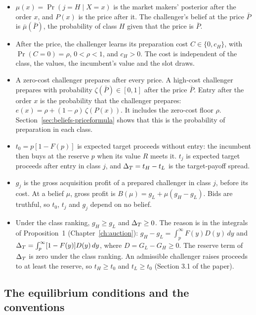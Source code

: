 \begin{itemize}
\item \(\mu(x)=\Pr(j=H\mid X=x)\) is the market makers' posterior after the order \(x\), and \(P(x)\) is the price after it. The challenger's belief at the price \(\bar P\) is \(\bar\mu(\bar P)\), the probability of class \(H\) given that the price is \(\bar P\).
\item After the price, the challenger learns its preparation cost \(C\in\{0,c_H\}\), with \(\Pr(C=0)=\rho\), \(0<\rho<1\), and \(c_H>0\). The cost is independent of the class, the values, the incumbent's value and the slot draws.
\item A zero-cost challenger prepares after every price. A high-cost challenger prepares with probability \(\zeta(\bar P)\in[0,1]\) after the price \(\bar P\). Entry after the order \(x\) is the probability that the challenger prepares: \(e(x)=\rho+(1-\rho)\,\zeta(P(x))\). It includes the zero-cost floor \(\rho\). Section~\ref{sec:beliefs-priceformula} shows that this is the probability of preparation in each class.
\item \(t_0=p[1-F(p)]\) is expected target proceeds without entry: the incumbent then buys at the reserve \(p\) when its value \(R\) meets it. \(t_j\) is expected target proceeds after entry in class \(j\), and \(\Delta_T=t_H-t_L\) is the target-payoff spread.
\item \(g_j\) is the gross acquisition profit of a prepared challenger in class \(j\), before its cost. At a belief \(\mu\), gross profit is \(B(\mu)=g_L+\mu(g_H-g_L)\). Bids are truthful, so \(t_0\), \(t_j\) and \(g_j\) depend on no belief.
\item Under the class ranking, \(g_H\ge g_L\) and \(\Delta_T\ge0\). The reason is in the integrals of Proposition~1 (Chapter~\ref{ch:auction}): \(g_H-g_L=\int_p^\infty F(y)D(y)\,dy\) and \(\Delta_T=\int_p^\infty[1-F(y)]D(y)\,dy\), where \(D=G_L-G_H\ge0\). The reserve term of \(\Delta_T\) is zero under the class ranking. An admissible challenger raises proceeds to at least the reserve, so \(t_H\ge t_0\) and \(t_L\ge t_0\) (Section 3.1 of the paper).
\end{itemize}

\subsection{The equilibrium conditions and the conventions}

